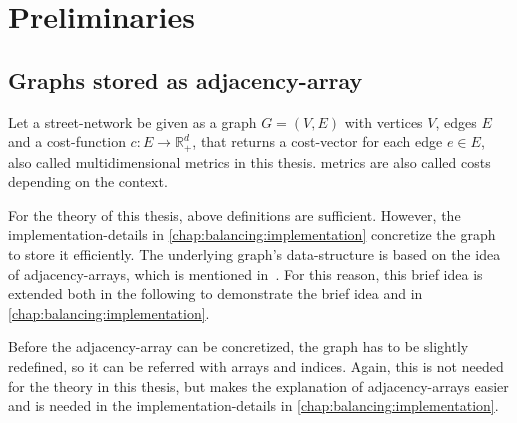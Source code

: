 \chapter{Preliminaries}
\label{chap:preliminaries}


\section{Graphs stored as adjacency-array}
\label{chap:preliminaries:graphs}

    Let a street-network be given as a graph $G = (V, E)$ with vertices $V$, edges $E$ and a cost-function $c: E \to \mathbb{R}_+^d$, that returns a cost-vector for each edge $e \in E$, also called multidimensional \glspl{metric} in this thesis.
    \Glspl{metric} are also called \glspl{cost} depending on the context.

    For the theory of this thesis, above definitions are sufficient.
    However, the implementation-details in \cref{chap:balancing:implementation} concretize the graph to store it efficiently.
    The underlying graph's data-structure is based on the idea of adjacency-arrays, which is mentioned in~\cite{mehlhorn:algorithms}.
    For this reason, this brief idea is extended both in the following to demonstrate the brief idea and in \cref{chap:balancing:implementation}.

    Before the adjacency-array can be concretized, the graph has to be slightly redefined, so it can be referred with arrays and indices.
    Again, this is not needed for the theory in this thesis, but makes the explanation of adjacency-arrays easier and is needed in the implementation-details in \cref{chap:balancing:implementation}.


